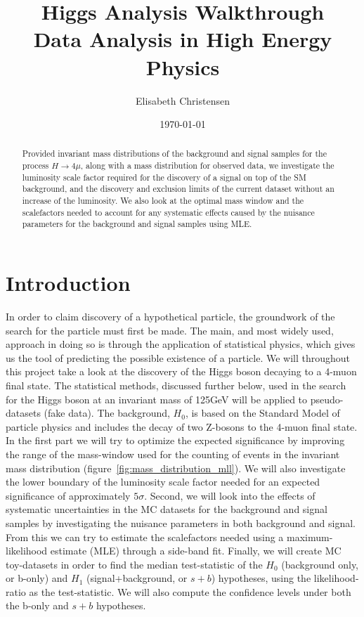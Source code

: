 \documentclass[12pt,a4paper]{amsart}
\title[Higgs analysis walkthrough]{Higgs Analysis Walkthrough\\
\small{\mdseries Data Analysis in High Energy Physics}}
\date{\today}
\author[Christensen]{Elisabeth Christensen}
\begin{document}
\maketitle

\begin{abstract}
Provided invariant mass distributions of the background and signal samples for the process $H\rightarrow 4\mu$, along with a mass distribution for observed data, we investigate the luminosity scale factor required for the discovery of a signal on top of the SM background, and the discovery and exclusion limits of the current dataset without an increase of the luminosity. We also look at the optimal mass window and the scalefactors needed to account for any systematic effects caused by the nuisance parameters for the background and signal samples using MLE.
\end{abstract}

\section{Introduction}\label{sec:introduction}
In order to claim discovery of a hypothetical particle, the groundwork of the search for the particle must first be made. The main, and most widely used, approach in doing so is through the application of statistical physics, which gives us the tool of predicting the possible existence of a particle. We will throughout this project take a look at the discovery of the Higgs boson decaying to a 4-muon final state. The statistical methods, discussed further below, used in the search for the Higgs boson at an invariant mass of 125GeV will be applied to pseudo-datasets (fake data). The background, $H_0$, is based on the Standard Model of particle physics and includes the decay of two Z-bosons to the 4-muon final state. In the first part we will try to optimize the expected significance by improving the range of the mass-window used for the counting of events in the invariant mass distribution (figure~\ref{fig:mass_distribution_mll}). We will also investigate the lower boundary of the luminosity scale factor needed for an expected significance of approximately $5\sigma$. Second, we will look into the effects of systematic uncertainties in the MC datasets for the background and signal samples by investigating the nuisance parameters in both background and signal. From this we can try to estimate the scalefactors needed using a maximum-likelihood estimate (MLE) through a side-band fit. Finally, we will create MC toy-datasets in order to find the median test-statistic of the $H_0$ (background only, or b-only) and $H_1$ (signal+background, or $s+b$) hypotheses, using the likelihood-ratio as the test-statistic. We will also compute the confidence levels under both the b-only and $s+b$ hypotheses.
\end{document}
